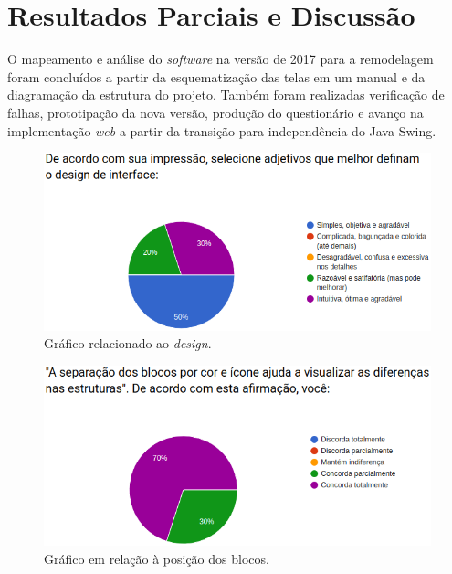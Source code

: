 \documentclass[12pt]{article}
\begin{document}
\section{Resultados Parciais e Discussão}
O mapeamento e análise do \textit{software} na versão de 2017 para a remodelagem foram concluídos a partir da esquematização das telas em um manual e da diagramação da estrutura do projeto. Também foram realizadas verificação de falhas, prototipação da nova versão, produção do questionário e avanço na implementação \textit{web} a partir da transição para independência do Java Swing.

	\begin{figure}[h]
		\centering
		\includegraphics[scale=0.5]{g1.png}
		\caption{Gráfico relacionado ao \textit{design}.}
		\label{fig3}
	\end{figure}
	\begin{figure}[h]
		\centering
		\includegraphics[scale=0.5]{g2.png}
		\caption{Gráfico em relação à posição dos blocos.}
		\label{fig4}
	\end{figure}	
\end{document}
